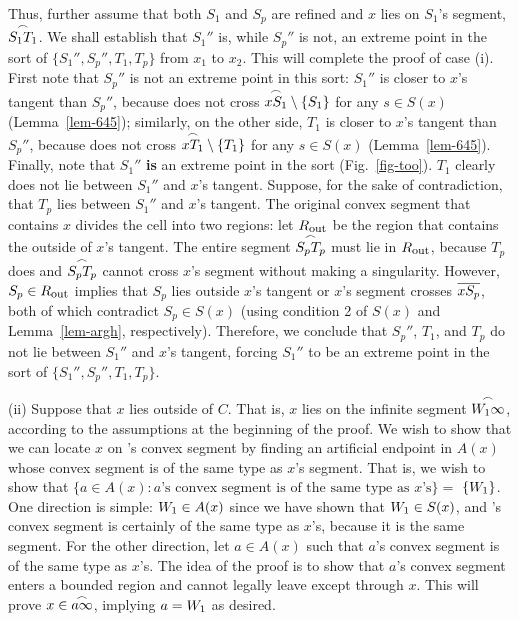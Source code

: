 Thus, further assume that both $S_{1}$ and $S_{p}$ are refined
and $x$ lies on $S_{1}$'s segment, $\mbox{$\stackrel{\frown}{S_{1}T_{1}}$}$.
We shall establish that $S_{1}''$ is, while $S_{p}''$ is not, an extreme point
in the sort of $\{S_{1}'',S_{p}'',T_{1},T_{p}\}$ from $x_{1}$ to $x_{2}$.
This will complete the proof of case (i).
First note that $S_{p}''$ is not an extreme point in this sort:
$S_{1}''$ is closer to $x$'s tangent than $S_{p}''$,
because  does not cross $\mbox{$\stackrel{\frown}{xS_{1}}$} \setminus \{S_{1}\}$ 
for any $s \in S(x)$ (Lemma~\ref{lem-645});
similarly, on the other side, $T_{1}$ is closer to $x$'s tangent than $S_{p}''$,
because  does not cross $\mbox{$\stackrel{\frown}{xT_{1}}$} \setminus \{T_{1}\}$ 
for any $s \in S(x)$ (Lemma~\ref{lem-645}).
Finally, note that $S_{1}''$ {\bf is} an extreme point in the sort (Fig.~\ref{fig-too}).
$T_{1}$ clearly does not lie between $S_{1}''$ and $x$'s tangent.
Suppose, for the sake of contradiction, that $T_{p}$ lies between $S_{1}''$ and $x$'s 
tangent.
The original convex segment that contains $x$ divides the cell into two regions:
let $R_{\mbox{\footnotesize{out}}}$ be the region that contains the outside of $x$'s tangent.
The entire segment $\mbox{$\stackrel{\frown}{S_{p}T_{p}}$}$ must lie in $R_{\mbox{\footnotesize{out}}}$, because
$T_{p}$ does and $\mbox{$\stackrel{\frown}{S_{p}T_{p}}$}$ cannot cross
$x$'s segment without making a singularity.
However, $S_{p} \in R_{\mbox{\footnotesize{out}}}$ implies that $S_{p}$ lies outside $x$'s 
tangent
or $x$'s segment crosses $\mbox{$\overline{xS_{p}}$}$, both of which contradict $S_{p} \in S(x)$
(using condition 2 of $S(x)$ and Lemma~\ref{lem-argh}, respectively).
Therefore,
we conclude that $S_{p}''$, $T_{1}$, and $T_{p}$ do not 
lie between $S_{1}''$ and $x$'s tangent,
forcing $S_{1}''$ to be an extreme point in the sort of $\{S_{1}'',S_{p}'',T_{1},T_{p}\}$.



(ii) Suppose that $x$ lies outside of $C$.
That is, $x$ lies on the infinite segment $\mbox{$\stackrel{\frown}{\mbox{$W_{1}$}\infty}$}$,
according to the assumptions at the beginning of the proof.
We wish to show that we can locate $x$ on \wo's convex segment
by finding an artificial endpoint
in $A(x)$ whose convex segment is of the same type as $x$'s segment.
That is, we wish to show that
\mbox{$\{a \in A(x): \mbox{$a$'s convex segment is of the same type as $x$'s}\} =$}
$\{\mbox{$W_{1}$}\}$.
One direction is simple: $\mbox{$W_{1}$} \in A(x)$ since we have shown that $\mbox{$W_{1}$} \in S(x)$,
and \wo's convex segment is certainly of the same type as $x$'s, because it is the same
segment.
For the other direction, let $a \in A(x)$ such that $a$'s convex segment 
is of the same type as $x$'s.
The idea of the proof is to show that $a$'s convex segment
enters a bounded region and cannot legally leave except through $x$.
This will prove $x \in \mbox{$\stackrel{\frown}{a\infty}$}$, implying $a = \mbox{$W_{1}$}$ as desired.

